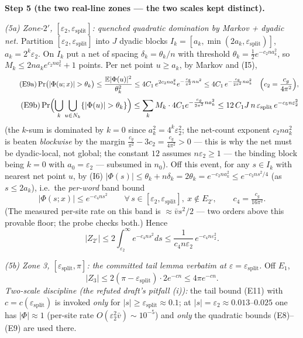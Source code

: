 \documentclass[
]{article}
\begin{document}
\textbf{Step 5 (the two real-line zones --- the two scales kept
distinct).}

\emph{(5a) Zone-$2'$, $[\varepsilon_2,\varepsilon_{\mathrm{split}}]$:
quenched quadratic domination by Markov + dyadic net.}  Partition
$[\varepsilon_2,\varepsilon_{\mathrm{split}}]$ into $J$ dyadic blocks
$I_k=[a_k,\min(2a_k,\varepsilon_{\mathrm{split}})]$, $a_k=2^k
\varepsilon_2$.  On $I_k$ put a net of spacing
$\delta_k=\theta_k/n$ with threshold
$\theta_k=\tfrac12e^{-c_2na_k^2}$, so $M_k\le2na_ke^{c_2na_k^2}+1$
points.  Per net point $u\ge a_k$, by Markov and (I5),
\[
  \tag{E9a}
  \Pr\bigl(|\Phi(u;x)|>\theta_k\bigr)
  \le\frac{\mathbb E|\Phi(u)|^2}{\theta_k^2}
  \le4C_1\,e^{2c_2na_k^2}e^{-\frac{c_g}{\pi^2}nu^2}
  \le4C_1\,e^{-\frac{c_g}{2\pi^2}na_k^2}
  \quad\Bigl(c_2=\frac{c_g}{4\pi^2}\Bigr),
\]
\[
  \tag{E9b}
  \Pr\Bigl(\bigcup_k\bigcup_{u\in N_k}\{|\Phi(u)|>\theta_k\}\Bigr)
  \le\sum_k M_k\cdot4C_1e^{-\frac{c_g}{2\pi^2}na_k^2}
  \le12\,C_1J\,n\,\varepsilon_{\mathrm{split}}\,
  e^{-c_5n\varepsilon_2^2}
\]
(the $k$-sum is dominated by $k=0$ since $a_k^2=4^k\varepsilon_2^2$;
the net-count exponent $c_2na_k^2$ is beaten \emph{blockwise} by the
margin $\tfrac{c_g}{\pi^2}-3c_2=\tfrac{c_g}{4\pi^2}>0$ --- this is why
the net must be dyadic-local, not global; the constant $12$ assumes
$n\varepsilon_2\ge1$ --- the binding block being $k=0$ with
$a_0=\varepsilon_2$ --- subsumed in $n_0$).  Off this event, for any
$s\in I_k$ with nearest net point $u$, by (I6)
$|\Phi(s)|\le\theta_k+n\delta_k=2\theta_k=e^{-c_2na_k^2}\le
e^{-c_2ns^2/4}$ (as $s\le2a_k$), i.e.\ the \emph{per-word} band bound
\[
  \tag{E9}
  |\Phi(s;x)|\le e^{-c_4ns^2}\qquad
  \forall\,s\in[\varepsilon_2,\varepsilon_{\mathrm{split}}],\
  x\notin E_{2'},\qquad c_4=\tfrac{c_g}{16\pi^2} .
\]
(The measured per-site rate on this band is $\approx\bar v s^2/2$ ---
two orders above this provable floor; the probe checks both.)  Hence
\[
  \tag{E10}
  |Z_{2'}|\le2\int_{\varepsilon_2}^{\infty}e^{-c_4ns^2}ds
  \le\frac{1}{c_4n\varepsilon_2}\,e^{-c_4n\varepsilon_2^2}.
\]

\emph{(5b) Zone 3, $[\varepsilon_{\mathrm{split}},\pi]$: the committed
tail lemma verbatim at $\varepsilon=\varepsilon_{\mathrm{split}}$.}
Off $E_1$,
\[
  \tag{E11}
  |Z_3|\le2(\pi-\varepsilon_{\mathrm{split}})\cdot2e^{-cn}
  \le4\pi e^{-cn}.
\]
\emph{Two-scale discipline (the refuted draft's pitfall (i)):} the tail
bound (E11) with $c=c(\varepsilon_{\mathrm{split}})$ is invoked
\emph{only} for $|s|\ge\varepsilon_{\mathrm{split}}\approx0.1$; at
$|s|=\varepsilon_2\approx0.013$--$0.025$ one has $|\Phi|\approx1$
(per-site rate $O(\varepsilon_2^2\bar v)\sim10^{-5}$) and \emph{only}
the quadratic bounds (E8)--(E9) are used there.
\end{document}
